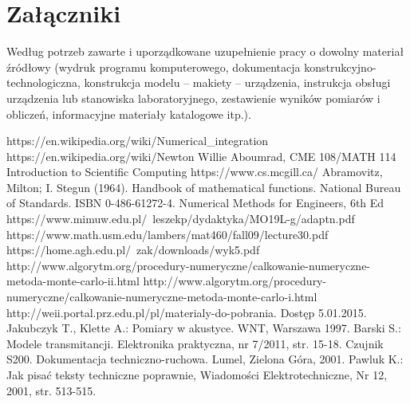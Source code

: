 \documentclass[12pt,twoside]{article}
\begin{document}
\clearpage

\section*{Załączniki}

Według potrzeb zawarte i uporządkowane uzupełnienie pracy o dowolny materiał źródłowy (wydruk programu komputerowego, dokumentacja kons\-truk\-cyj\-no-\-tech\-no\-lo\-gicz\-na, konstrukcja modelu -- makiety -- urządzenia, instrukcja obsługi urządzenia lub stanowiska laboratoryjnego, zestawienie wyników pomiarów i obliczeń, informacyjne materiały katalogowe itp.).


\clearpage


\begin{thebibliography}{4}
 https://en.wikipedia.org/wiki/Numerical\_integration
 https://en.wikipedia.org/wiki/Newton%
 Willie Aboumrad, CME 108/MATH 114 Introduction to Scientific Computing
 https://www.cs.mcgill.ca/
 Abramovitz, Milton; I. Stegun (1964). Handbook of mathematical functions. National Bureau of Standards. ISBN 0-486-61272-4.
 Numerical Methods for Engineers, 6th Ed
 https://www.mimuw.edu.pl/~leszekp/dydaktyka/MO19L-g/adaptn.pdf
 https://www.math.usm.edu/lambers/mat460/fall09/lecture30.pdf
 https://home.agh.edu.pl/~zak/downloads/wyk5.pdf
 http://www.algorytm.org/procedury-numeryczne/calkowanie-numeryczne-metoda-monte-carlo-ii.html
 http://www.algorytm.org/procedury-numeryczne/calkowanie-numeryczne-metoda-monte-carlo-i.html
 http://weii.portal.prz.edu.pl/pl/materialy-do-pobrania. Dostęp 5.01.2015.
 Jakubczyk T., Klette A.: Pomiary w akustyce. WNT, Warszawa 1997.
 Barski S.: Modele transmitancji. Elektronika praktyczna, nr 7/2011, str. 15-18.
 Czujnik S200. Dokumentacja techniczno-ruchowa. Lumel, Zielona Góra, 2001.
 Pawluk K.: Jak pisać teksty techniczne poprawnie, Wiadomości Elektrotechniczne, Nr 12, 2001, str. 513-515.
\end{thebibliography}

\clearpage

\makesummary
\end{document}
